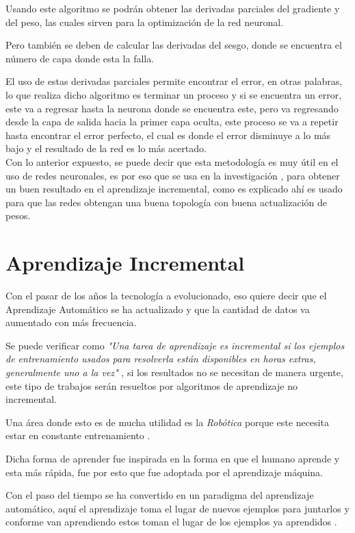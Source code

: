       Usando este algoritmo se podrán obtener las derivadas parciales del gradiente y del peso, las cuales sirven para la optimizaci\'on de la red neuronal.

      Pero también se deben de calcular las derivadas del sesgo, donde se encuentra el n\'umero de capa donde esta la falla.

      El uso de estas derivadas parciales permite encontrar el error, en otras palabras, lo que realiza dicho algoritmo es terminar un proceso y si se encuentra un error, este va a regresar hasta la neurona donde se encuentra este, pero va regresando desde la capa de salida hacia la primer capa oculta, este proceso se va a repetir hasta encontrar el error perfecto, el cual es donde el error disminuye a lo m\'as bajo y el resultado de la red es lo m\'as acertado.\\

      Con lo anterior expuesto, se puede decir que esta metodolog\'ia es muy \'util en el uso de redes neuronales, es por eso que se usa en la investigaci\'on \cite{bullinaria2009}, para obtener un buen resultado en el aprendizaje incremental, como es explicado ah\'i es usado para que las redes obtengan una buena topolog\'ia con buena actualizaci\'on de pesos.

  \section{Aprendizaje Incremental}
    Con el pasar de los años la tecnología a evolucionado, eso quiere decir que el Aprendizaje Automático se ha actualizado y que la cantidad de datos va aumentado con más frecuencia.
    
    Se puede verificar como \textit{"Una tarea de aprendizaje es incremental si los ejemplos de entrenamiento usados para resolverla están disponibles en horas extras, generalmente uno a la vez"} \cite{GiraudCarrier2000}, si los resultados no se necesitan de manera urgente, este tipo de trabajos serán resueltos por algoritmos de aprendizaje no incremental. 

    Una área donde esto es de mucha utilidad es la \textit{Rob\'otica} porque este necesita estar en constante entrenamiento \cite{GiraudCarrier2000}.

    Dicha forma de aprender fue inspirada en la forma en que el humano aprende y esta más rápida, fue por esto que fue adoptada por el aprendizaje m\'aquina.

    Con el paso del tiempo se ha convertido en un paradigma del aprendizaje automático, aquí el aprendizaje toma el lugar de nuevos ejemplos para juntarlos y conforme van aprendiendo estos toman el lugar de los ejemplos ya aprendidos \cite{liu2015}.

